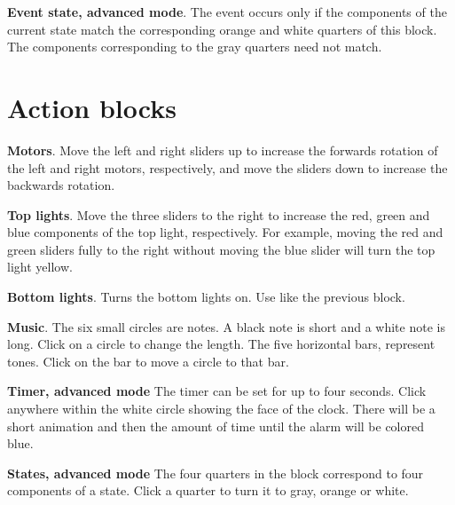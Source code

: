 \bigskip\bigskip\bigskip\bigskip

 \textbf{Event state, advanced mode}. The event
occurs only if the components of the current state match the
corresponding orange and white quarters of this block. The components
corresponding to the gray quarters need not match.

\bigskip\bigskip\bigskip\bigskip

\section*{Action blocks}

 \textbf{Motors}. Move the left and right sliders
up to increase the forwards rotation of the left and right motors,
respectively, and move the sliders down to increase the backwards
rotation.

\bigskip\bigskip

 \textbf{Top lights}. Move the three sliders to
the right to increase the red, green and blue components of the top
light, respectively. For example, moving the red and green sliders fully
to the right without moving the blue slider will turn the top light
yellow.

\bigskip\bigskip

 \textbf{Bottom lights}. Turns the bottom
lights on. Use like the previous block.

\bigskip\bigskip\bigskip

 \textbf{Music}. The six small circles are notes. A
black note is short and a white note is long. Click on a circle to
change the length. The five horizontal bars, represent tones. Click on
the bar to move a circle to that bar.


\bigskip\bigskip\bigskip

 \textbf{Timer, advanced mode} The timer can be set
for up to four seconds. Click anywhere within the white circle showing
the face of the clock. There will be a short animation and then the
amount of time until the alarm will be colored blue.

\bigskip\bigskip

 \textbf{States, advanced mode} The four
quarters in the block correspond to four components of a state.
Click a quarter to turn it to gray, orange or white.
